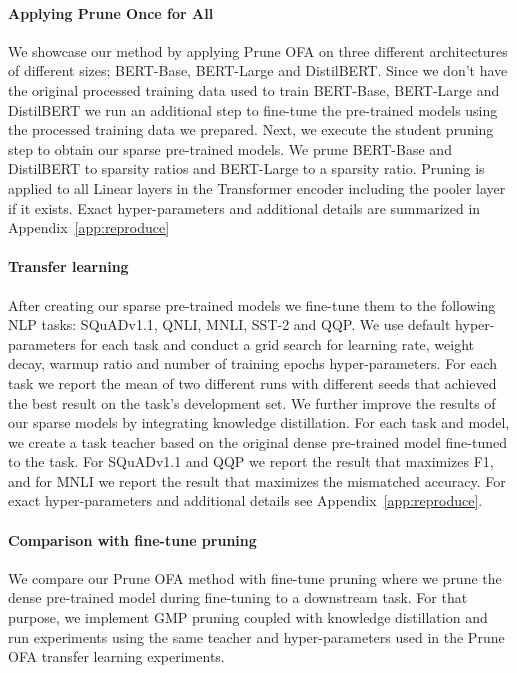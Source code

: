 \documentclass{article}
\begin{document}
\paragraph{Applying Prune Once for All}
\label{sec:apply-pofa}
We showcase our method by applying Prune OFA on three different architectures of different sizes; BERT-Base, BERT-Large and DistilBERT.
Since we don't have the original processed training data used to train BERT-Base, BERT-Large and DistilBERT we run an additional step to fine-tune the pre-trained models using the processed training data we prepared.
Next, we execute the student pruning step to obtain our sparse pre-trained models.
We prune BERT-Base and DistilBERT to  sparsity ratios and BERT-Large to a  sparsity ratio.
Pruning is applied to all Linear layers in the Transformer encoder including the pooler layer if it exists.
Exact hyper-parameters and additional details are summarized in Appendix~\ref{app:reproduce}

\paragraph{Transfer learning}
After creating our sparse pre-trained models we fine-tune them to the following NLP tasks: SQuADv1.1, QNLI, MNLI, SST-2 and QQP.
We use default hyper-parameters for each task and conduct a grid search for learning rate, weight decay, warmup ratio and number of training epochs hyper-parameters.
For each task we report the mean of two different runs with different seeds that achieved the best result on the task's development set.
We further improve the results of our sparse models by integrating knowledge distillation.
For each task and model, we create a task teacher based on the original dense pre-trained model fine-tuned to the task.
For SQuADv1.1 and QQP we report the result that maximizes F1, and for MNLI we report the result that maximizes the mismatched accuracy.
For exact hyper-parameters and additional details see Appendix~\ref{app:reproduce}.

\paragraph{Comparison with fine-tune pruning}
We compare our Prune OFA method with fine-tune pruning where we prune the dense pre-trained model during fine-tuning to a downstream task. 
For that purpose, we implement GMP pruning coupled with knowledge distillation and run experiments using the same teacher and hyper-parameters used in the Prune OFA transfer learning experiments.
\end{document}

